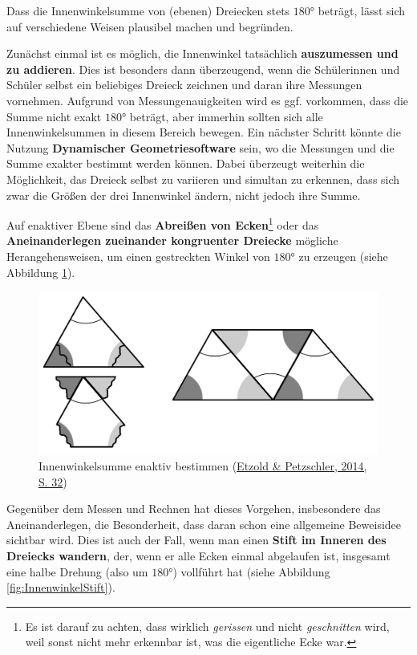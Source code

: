 \documentclass[
  ngerman,
]{scrbook}
\theoremstyle{definition}
\theoremstyle{definition}
\theoremstyle{definition}
\theoremstyle{definition}
\theoremstyle{remark}
\begin{document}
Dass die Innenwinkelsumme von (ebenen) Dreiecken stets \(180°\) beträgt, lässt sich auf verschiedene Weisen plausibel machen und begründen.

Zunächst einmal ist es möglich, die Innenwinkel tatsächlich \textbf{auszumessen und zu addieren}. Dies ist besonders dann überzeugend, wenn die Schülerinnen und Schüler selbst ein beliebiges Dreieck zeichnen und daran ihre Messungen vornehmen. Aufgrund von Messungenauigkeiten wird es ggf. vorkommen, dass die Summe nicht exakt \(180°\) beträgt, aber immerhin sollten sich alle Innenwinkelsummen in diesem Bereich bewegen. Ein nächster Schritt könnte die Nutzung \textbf{Dynamischer Geometriesoftware} sein, wo die Messungen und die Summe exakter bestimmt werden können. Dabei überzeugt weiterhin die Möglichkeit, das Dreieck selbst zu variieren und simultan zu erkennen, dass sich zwar die Größen der drei Innenwinkel ändern, nicht jedoch ihre Summe.

Auf enaktiver Ebene sind das \textbf{Abreißen von Ecken}\footnote{Es ist darauf zu achten, dass wirklich \emph{gerissen} und nicht \emph{geschnitten} wird, weil sonst nicht mehr erkennbar ist, was die eigentliche Ecke war.} oder das \textbf{Aneinanderlegen zueinander kongruenter Dreiecke} mögliche Herangehensweisen, um einen gestreckten Winkel von \(180°\) zu erzeugen (siehe Abbildung \ref{fig:InnenwinkelReissen}).



\begin{figure}

{\centering \includegraphics[width=0.75\linewidth]{pictures/C-InnenwinkelReissen} 

}

\caption{Innenwinkelsumme enaktiv bestimmen (\protect\hyperlink{ref-Etzold2014a}{Etzold \& Petzschler, 2014, S. 32})}\label{fig:InnenwinkelReissen}
\end{figure}

Gegenüber dem Messen und Rechnen hat dieses Vorgehen, insbesondere das Aneinanderlegen, die Besonderheit, dass daran schon eine allgemeine Beweisidee sichtbar wird. Dies ist auch der Fall, wenn man einen \textbf{Stift im Inneren des Dreiecks wandern}, der, wenn er alle Ecken einmal abgelaufen ist, insgesamt eine halbe Drehung (also um \(180°\)) vollführt hat (siehe Abbildung \ref{fig:InnenwinkelStift}).
\end{document}

